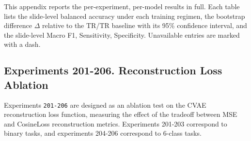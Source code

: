 This appendix reports the per-experiment, per-model results in full. Each table lists the slide-level balanced accuracy under each training regimen, the bootstrap difference $\Delta$ relative to the TR/TR baseline with its 95\% confidence interval, and the slide-level Macro F1, Sensitivity, Specificity. Unavailable entries are marked with a dash.

\subsection*{Experiments 201-206. Reconstruction Loss Ablation}
Experiments \texttt{201-206} are designed as an ablation test on the CVAE reconstruction loss function, measuring the effect of the tradeoff between MSE and CosineLoss reconstruction metrics. Experiments 201-203 correspond to binary tasks, and experiments 204-206 correspond to 6-class tasks.

